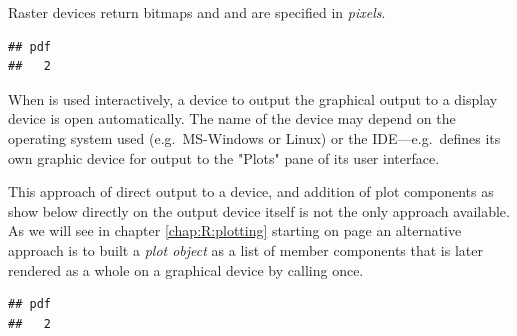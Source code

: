 \documentclass[krantz2]{krantz}\usepackage{knitr}%
\begin{document}
Raster devices return bitmaps and  and  are specified in \emph{pixels}.

\begin{knitrout}\footnotesize
{}\color{fgcolor}\begin{kframe}
\begin{alltt}
\hlstd{(} \hlstd{=} \hlstd{,}  \hlstd{=} \hlstd{,}  \hlstd{=} \hlstd{)}
 \hlopt{~}   
\hlstd{()}
\end{alltt}
\begin{verbatim}
## pdf 
##   2
\end{verbatim}
\end{kframe}
\end{knitrout}

When \Rlang is used interactively, a device to output the graphical output to a display device is open automatically. The name of the device may depend on the operating system used (e.g.\ MS-Windows or Linux) or the IDE---e.g.\ \RStudio defines its own graphic device for output to the "Plots" pane of its user interface.

\begin{warningbox}
This approach of direct output to a device, and addition of plot components as show below directly on the output device itself is not the only approach available. As we will see in chapter \ref{chap:R:plotting} starting on page \pageref{chap:R:plotting} an alternative approach is to built a \emph{plot object} as a list of member components that is later rendered as a whole on a graphical device by calling  once.

\begin{knitrout}\footnotesize
{}\color{fgcolor}\begin{kframe}
\begin{alltt}
\hlstd{(} \hlstd{=} \hlstd{,}  \hlstd{=} \hlstd{,}  \hlstd{=} \hlstd{)}
 \hlopt{~}   
\hlstd{(} \hlstd{=} \hlstd{,}  \hlstd{=} \hlstd{,}  \hlstd{=} \hlstd{)}
\hlstd{()}
\end{alltt}
\begin{verbatim}
## pdf 
##   2
\end{verbatim}
\end{kframe}
\end{knitrout}
\end{warningbox}
\end{document}
